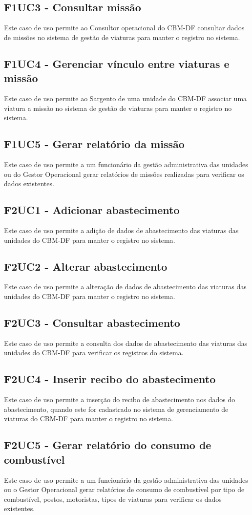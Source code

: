   \subsection{F1UC3 - Consultar missão}
Este caso de uso permite ao Consultor operacional do CBM-DF consultar dados de missões no sistema de gestão de viaturas para manter o registro no sistema.
  \subsection{F1UC4 - Gerenciar vínculo entre viaturas e missão}
Este caso de uso permite ao Sargento de uma unidade do CBM-DF associar uma viatura a missão no sistema de gestão de viaturas para manter o registro no sistema.
  \subsection{F1UC5 - Gerar relatório da missão}
Este caso de uso permite a um funcionário da gestão administrativa das unidades ou do Gestor Operacional gerar relatórios de missões realizadas para verificar os dados existentes.
  \subsection{F2UC1 - Adicionar abastecimento}
Este caso de uso permite a adição de dados de abastecimento das viaturas das unidades do CBM-DF para manter o registro no sistema.
  \subsection{F2UC2 - Alterar abastecimento}
Este caso de uso permite a alteração de dados de abastecimento das viaturas das unidades do CBM-DF para manter o registro no sistema.
  \subsection{F2UC3 - Consultar abastecimento}
Este caso de uso permite a consulta dos dados de abastecimento das viaturas das unidades do CBM-DF para verificar os registros do sistema.
  \subsection{F2UC4 - Inserir recibo do abastecimento}
Este caso de uso permite a inserção do recibo de abastecimento nos dados do abastecimento, quando este for cadastrado no sistema de gerenciamento de viaturas do CBM-DF para manter o registro no sistema.
  \subsection{F2UC5 - Gerar relatório do consumo de combustível}
Este caso de uso permite a um funcionário da gestão administrativa das unidades ou o Gestor Operacional gerar relatórios de consumo de combustível por tipo de combustível, postos, motoristas, tipos de viaturas para verificar os dados existentes. 
